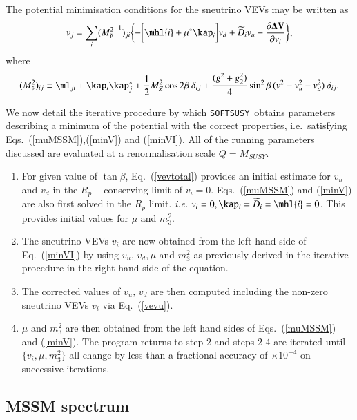 \documentclass[final,3p,times,pdflatex]{elsarticle}
\def\SOFTSUSY{{\tt SOFTSUSY}}
\begin{document}
The potential minimisation conditions for the sneutrino VEVs may be
written as
\begin{equation}
v_j = \sum_i({M_{\tilde{\nu}}^2}^{-1})_{ji}\biggl \{ -\biggl [ \mhl{i}+\mu^*\kap_i \biggr ]
v_d + \widetilde{D}_i v_u -\frac{\partial 
{\bf \Delta V}}{\partial v_i} \biggr \}, \label{minVI}
\end{equation}
where
\begin{equation}
(M_{\tilde{\nu}}^2)_{ij} \equiv \ml_{ji}+\kap_i\kap_j^* +\frac{1}{2}
M_Z^2 \cos2\beta \: \delta_{ij} 
+\frac{(g^2+g_2^2)}{4} 
\sin^2\beta\, (v^2-v_u^2-v_d^2)\: \delta_{ij}.
\end{equation}

We now detail the iterative procedure 
by which \SOFTSUSY~obtains parameters describing a
minimum of the potential with the correct properties, i.e.\ satisfying
Eqs.~(\ref{muMSSM}),(\ref{minV}) and (\ref{minVI}). All of the running
parameters discussed are evaluated at 
a renormalisation scale $Q=M_{SUSY}$. 
\begin{enumerate}
\item
For given value of $\tan \beta$, 
Eq.~(\ref{vevtotal})
provides an initial estimate for $v_u$ and $v_d$ in the $R_p-$conserving limit
of $v_i=0$.  
Eqs.~(\ref{muMSSM}) and (\ref{minV}) are also first solved in the $R_p$
limit. 
\textit{i.e.} 
$v_i=0,\kap_i=\widetilde{D}_i=\mhl{i}=0$. This provides initial values
for $\mu$ and $m_3^2$. 
\item
The sneutrino VEVs $v_i$ are now obtained from the left hand side of
Eq.~(\ref{minVI})  
by using $v_u,\,v_d, \mu$ and $m_3^2$ as 
previously derived in the iterative procedure in the right hand side of the
equation. 
\item
The
corrected values of $v_u,\,v_d$ are then computed including the
non-zero sneutrino VEVs $v_i$ via Eq.~(\ref{vevu}). 
\item
$\mu$ and 
$m_3^2$ are then obtained from the left hand sides of 
Eqs.~(\ref{muMSSM}) and (\ref{minV}). The program returns to step 2 and steps
2-4 are iterated until 
$\{ v_i, \mu, m_3^2 \}$ all change by less
than a fractional accuracy of $\times 10^{-4}$ on successive
iterations.  
\end{enumerate}


\subsection{MSSM spectrum \label{spec}}
\end{document}
